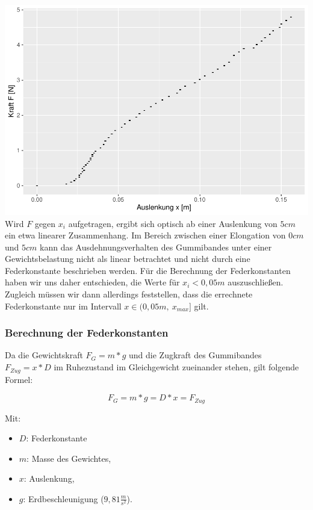 \documentclass[
  9pt,
]{article}
\providecommand{\tightlist}{%
  \setlength{\itemsep}{0pt}\setlength{\parskip}{0pt}}
\begin{document}
\includegraphics{DehnbareStoffe_files/figure-latex/unnamed-chunk-5-1.pdf}
Wird \(F\) gegen \(x_i\) aufgetragen, ergibt sich optisch ab einer
Auslenkung von \(5cm\) ein etwa linearer Zusammenhang. Im Bereich
zwischen einer Elongation von \(0cm\) und \(5cm\) kann das
Ausdehnungsverhalten des Gummibandes unter einer Gewichtsbelastung nicht
als linear betrachtet und nicht durch eine Federkonstante beschrieben
werden. Für die Berechnung der Federkonstanten haben wir uns daher
entschieden, die Werte für \(x_i<0,05m\) auszuschließen. Zugleich müssen
wir dann allerdings feststellen, dass die errechnete Federkonstante nur
im Intervall \(x \in (0,05m,\ x_{max}]\) gilt.

\hypertarget{berechnung-der-federkonstanten}{%
\subsubsection{Berechnung der
Federkonstanten}\label{berechnung-der-federkonstanten}}

Da die Gewichtskraft \(F_G=m*g\) und die Zugkraft des Gummibandes
\(F_{Zug} = x * D\) im Ruhezustand im Gleichgewicht zueinander stehen,
gilt folgende Formel:

\[F_G = m * g = D*x = F_{Zug}\]

Mit:

\begin{itemize}
\tightlist
\item
  \(D\): Federkonstante
\item
  \(m\): Masse des Gewichtes,
\item
  \(x\): Auslenkung,
\item
  \(g\): Erdbeschleunigung (\(9,81\frac{m}{s^2}\)).
\end{itemize}
\end{document}
